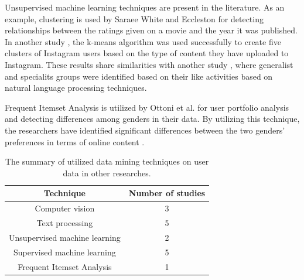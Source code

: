   Unsupervised machine learning techniques are present in the literature. As an example, clustering is used by Saraee White and Eccleston \cite{saraee2004data} for detecting relationships between the ratings given on a movie and the year it was published. In another study \cite{hu2014we}, the k-means algorithm was used successfully to create five clusters of Instagram users based on the type of content they have uploaded to Instagram. These results share similarities with another study \cite{jang2015no}, where generalist and specialits groups were identified based on their like activities based on natural language processing techniques. 

Frequent Itemset Analysis is utilized by Ottoni et al. \cite{ottoni2013ladies} for user portfolio analysis and detecting differences among genders in their data. By utilizing this technique, the researchers have identified significant differences between the two genders' preferences in terms of online content \cite{ottoni2013ladies}. 

\begin{table}[!t]
  \centering
    \begin{tabular}{c||c}
      Technique & Number of studies \\ 
      \hline
      Computer vision & 3  \\
      Text processing & 5 \\
      Unsupervised machine learning & 2 \\
      Supervised machine learning & 5 \\
      Frequent Itemset Analysis & 1
    \end{tabular}
    \caption{The summary of utilized data mining techniques on user data in other researches.}
    \label{table_of_techniques}
\end{table}